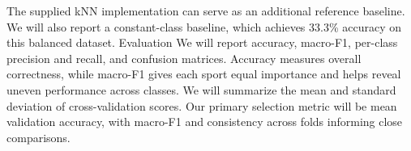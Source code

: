 \documentclass[12pt]{article}
\begin{document}
The supplied kNN implementation can serve as an additional reference baseline. We will also report a constant-class baseline, which achieves 33.3\% accuracy on this balanced dataset.
Evaluation
We will report accuracy, macro-F1, per-class precision and recall, and confusion matrices. Accuracy measures overall correctness, while macro-F1 gives each sport equal importance and helps reveal uneven performance across classes.
We will summarize the mean and standard deviation of cross-validation scores. Our primary selection metric will be mean validation accuracy, with macro-F1 and consistency across folds informing close comparisons.

\end{document}
